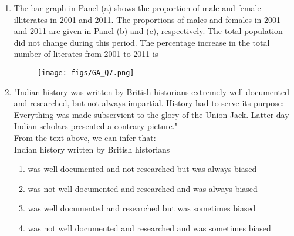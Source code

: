 \documentclass[a4paper, 11pt]{article}
\begin{document}
\begin{enumerate}
    \item The bar graph in Panel (a) shows the proportion of male and female illiterates in 2001 and 2011. The proportions of males and females in 2001 and 2011 are given in Panel (b) and (c), respectively. The total population did not change during this period. The percentage increase in the total number of literates from 2001 to 2011 is
    \begin{figure}[H]
        \centering
        \texttt{[image: figs/GA\_Q7.png]}
        \caption*{}
        \label{fig:q7}
    \end{figure}
    \begin{enumerate}
    \end{enumerate}
    \hfill{}

    \item "Indian history was written by British historians extremely well documented and researched, but not always impartial. History had to serve its purpose: Everything was made subservient to the glory of the Union Jack. Latter-day Indian scholars presented a contrary picture."\\From the text above, we can infer that:\\Indian history written by British historians
    \begin{enumerate}
        \item was well documented and not researched but was always biased
        \item was not well documented and researched and was always biased
        \item was well documented and researched but was sometimes biased
        \item was not well documented and researched and was sometimes biased
    \end{enumerate}
    \hfill{}


\end{enumerate}
\end{document}

